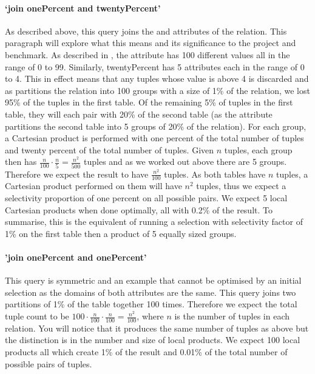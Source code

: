 \paragraph{`join onePercent and twentyPercent'} As described above, this query
joins the  and 
attributes of the  relation. This paragraph will explore
what this means and its significance to the project and benchmark. As described
in , the attribute 
has 100 different values all in the range of 0 to 99. Similarly, twentyPercent
has 5 attributes each in the range of 0 to 4. This in effect means that any
tuples whose  value is above 4 is discarded and as
 partitions the relation into 100 groups with a
size of 1\% of the relation, we lost 95\% of the tuples in the first table. Of
the remaining 5\% of tuples in the first table, they will each pair with 20\% of
the second table (as the attribute  partitions
the second table into 5 groups of 20\% of the relation). For each group, a
Cartesian product is performed with one percent of the total number of tuples
and twenty percent of the total number of tuples. Given $n$ tuples, each group
then has $\frac{n}{100} \cdot \frac{n}{5} = \frac{n^2}{500}$ tuples and as we
worked out above there are 5 groups. Therefore we expect the result to have
$\frac{n^2}{100}$ tuples. As both tables have $n$ tuples, a Cartesian product
performed on them will have $n^2$ tuples, thus we expect a selectivity
proportion of one percent on all possible pairs. We expect 5 local Cartesian
products when done optimally, all with 0.2\% of the result. To summarise, this
is the equivalent of running a selection with selectivity factor of 1\% on the
first table then a product of 5 equally sized groups.

\paragraph{'join onePercent and onePercent'} This query is symmetric and an
example that cannot be optimised by an initial selection as the domains of both
attributes are the same. This query joins two partitions of 1\% of the table
together 100 times. Therefore we expect the total tuple count to be $100 \cdot
\frac{n}{100} \cdot \frac{n}{100} = \frac{n^2}{100}$, where $n$ is the number of
tuples in each relation. You will notice that it produces the same number of
tuples as above but the distinction is in the number and size of local products.
We expect 100 local products all which create 1\% of the result and 0.01\% of
the total number of possible pairs of tuples.
